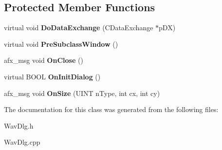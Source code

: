 \subsection*{Protected Member Functions}
\begin{DoxyCompactItemize}
\item 
\hypertarget{class_c_wav_dlg_a2110624738177744747911189196b414}{virtual void {\bfseries Do\-Data\-Exchange} (C\-Data\-Exchange $\ast$p\-D\-X)}\label{class_c_wav_dlg_a2110624738177744747911189196b414}

\item 
\hypertarget{class_c_wav_dlg_aff2442adcc95dbff6492b336cf564f31}{virtual void {\bfseries Pre\-Subclass\-Window} ()}\label{class_c_wav_dlg_aff2442adcc95dbff6492b336cf564f31}

\item 
\hypertarget{class_c_wav_dlg_a692e02a5e2264072d26b796637709a4b}{afx\-\_\-msg void {\bfseries On\-Close} ()}\label{class_c_wav_dlg_a692e02a5e2264072d26b796637709a4b}

\item 
\hypertarget{class_c_wav_dlg_a775275d3b5583ef4fb80f77c42be26f8}{virtual B\-O\-O\-L {\bfseries On\-Init\-Dialog} ()}\label{class_c_wav_dlg_a775275d3b5583ef4fb80f77c42be26f8}

\item 
\hypertarget{class_c_wav_dlg_ab45dd753be665a8efa4d6c27a9311c8e}{afx\-\_\-msg void {\bfseries On\-Size} (U\-I\-N\-T n\-Type, int cx, int cy)}\label{class_c_wav_dlg_ab45dd753be665a8efa4d6c27a9311c8e}

\end{DoxyCompactItemize}


The documentation for this class was generated from the following files\-:\begin{DoxyCompactItemize}
\item 
Wav\-Dlg.\-h\item 
Wav\-Dlg.\-cpp\end{DoxyCompactItemize}

